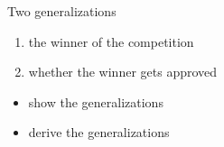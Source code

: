 \documentclass[xcolor=dvipsnames,10pt]{beamer}
\begin{document}
\begin{frame}{Two generalizations}

\pause

\begin{enumerate}
  \item the winner of the competition  \pause
  \item whether the winner gets approved 
\end{enumerate}

\pause
\pause

\vspace{1em}

\begin{itemize}
  \item show the generalizations\pause
  \item derive the generalizations
\end{itemize}

\end{frame}
\end{document}
